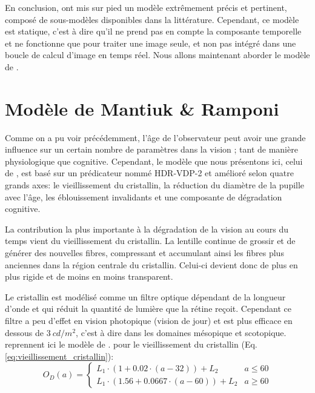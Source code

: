 	\par En conclusion, \citep{pattanaik_multiscale_1998} ont mis sur pied un modèle extrêmement précis et pertinent, composé de sous-modèles disponibles dans la littérature. Cependant, ce modèle est statique, c'est à dire qu'il ne prend pas en compte la composante temporelle et ne fonctionne que pour traiter une image seule, et non pas intégré dans une boucle de calcul d'image en temps réel. Nous allons maintenant aborder le modèle de \citep{mantiuk_human_2015}.
	
	\chapter{Modèle de Mantiuk \& Ramponi}
	\label{sec:modele_mantiuk}
	\par Comme on a pu voir précédemment, l'âge de l'observateur peut avoir une grande influence sur un certain nombre de paramètres dans la vision ; tant de manière physiologique que cognitive. Cependant, le modèle que nous présentons ici, celui de \citep{mantiuk_human_2015}, est basé sur un prédicateur nommé HDR-VDP-2 et amélioré selon quatre grands axes: le vieillissement du cristallin, la réduction du diamètre de la pupille avec l'âge, les éblouissement invalidants et une composante de dégradation cognitive. 
	
	\par La contribution la plus importante à la dégradation de la vision au cours du temps vient du vieillissement du cristallin. La lentille continue de grossir et de générer des nouvelles fibres, compressant et accumulant ainsi les fibres plus anciennes dans la région centrale du cristallin. Celui-ci devient donc de plus en plus rigide et de moins en moins transparent.
	
	\par Le cristallin est modélisé comme un filtre optique dépendant de la longueur d'onde et qui réduit la quantité de lumière que la rétine reçoit. Cependant ce filtre a peu d'effet en vision photopique (vision de jour) et est plus efficace en dessous de $3~cd/m^2$, c'est à dire dans les domaines mésopique et scotopique.
	\citep{mantiuk_human_2015} reprennent ici le modèle de \citep{pokorny_aging_1987}. pour le vieillissement du cristallin (Eq. \ref{eq:vieillissement_cristallin}):
	\begin{equation}
		O_D(a) = \begin{cases}
			 L_1 \cdot (1+0.02 \cdot (a-32))+L_2 & a \leq 60 \\ L_1 \cdot (1.56+0.0667 \cdot (a-60))+L_2 & a \geq 60 \end{cases}
		\label{eq:vieillissement_cristallin}
	\end{equation}
	
